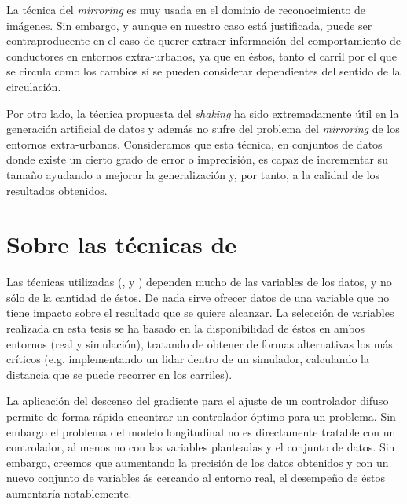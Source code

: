La técnica del \textit{mirroring} es muy usada en el dominio de reconocimiento de imágenes. Sin embargo, y aunque en nuestro caso está justificada, puede ser contraproducente en el caso de querer extraer información del comportamiento de conductores en entornos extra-urbanos, ya que en éstos, tanto el carril por el que se circula como los cambios sí se pueden considerar dependientes del sentido de la circulación.

Por otro lado, la técnica propuesta del \textit{shaking} ha sido extremadamente útil en la generación artificial de datos y además no sufre del problema del \textit{mirroring} de los entornos extra-urbanos. Consideramos que esta técnica, en conjuntos de datos donde existe un cierto grado de error o imprecisión, es capaz de incrementar su tamaño ayudando a mejorar la generalización y, por tanto, a la calidad de los resultados obtenidos.

\section{Sobre las técnicas de }

Las técnicas utilizadas (,  y ) dependen mucho de las variables de los datos, y no sólo de la cantidad de éstos. De nada sirve ofrecer datos de una variable que no tiene impacto sobre el resultado que se quiere alcanzar. La selección de variables realizada en esta tesis se ha basado en la disponibilidad de éstos en ambos entornos (real y simulación), tratando de obtener de formas alternativas los más críticos (e.g. implementando un \acrshort{lidar} dentro de un simulador, calculando la distancia que se puede recorrer en los carriles).

La aplicación del descenso del gradiente para el ajuste de un controlador difuso permite de forma rápida encontrar un controlador óptimo para un problema. Sin embargo el problema del modelo longitudinal no es directamente tratable con un controlador, al menos no con las variables planteadas y el conjunto de datos. Sin embargo, creemos que aumentando la precisión de los datos obtenidos y con un nuevo conjunto de variables ás cercando al entorno real, el desempeño de éstos aumentaría notablemente.

